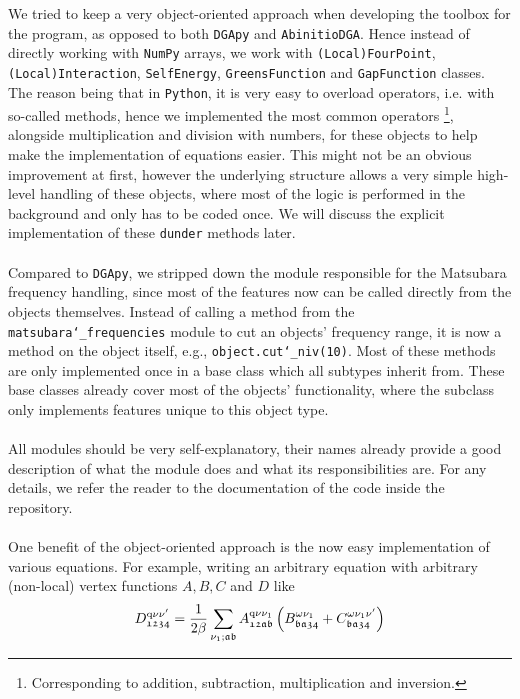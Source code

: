 \documentclass[../../main.tex]{subfiles}
\begin{document}
We tried to keep a very object-oriented approach when developing the toolbox for the program, as opposed to both \texttt{DGApy} and \texttt{AbinitioDGA}. Hence instead of directly working with \texttt{NumPy} arrays, we work with \texttt{(Local)FourPoint}, \texttt{(Local)Interaction}, \texttt{SelfEnergy}, \texttt{GreensFunction} and \texttt{GapFunction} classes. The reason being that in \texttt{Python}, it is very easy to overload operators, i.e. with so-called  methods, hence we implemented the most common operators \footnote{Corresponding to addition, subtraction, multiplication and inversion.}, alongside multiplication and division with numbers, for these objects to help make the implementation of equations easier. This might not be an obvious improvement at first, however the underlying structure allows a very simple high-level handling of these objects, where most of the logic is performed in the background and only has to be coded once. We will discuss the explicit implementation of these \texttt{dunder} methods later.
\\\\
Compared to \texttt{DGApy}, we stripped down the module responsible for the Matsubara frequency handling, since most of the features now can be called directly from the objects themselves. Instead of calling a method from the \texttt{matsubara\char`_frequencies} module to cut an objects' frequency range, it is now a method on the object itself, e.g., \texttt{object.cut\char`_niv(10)}. Most of these methods are only implemented once in a base class which all subtypes inherit from. These base classes already cover most of the objects' functionality, where the subclass only implements features unique to this object type.
\\\\
All modules should be very self-explanatory, their names already provide a good description of what the module does and what its responsibilities are. For any details, we refer the reader to the documentation of the code inside the repository.
\\\\
One benefit of the object-oriented approach is the now easy implementation of various equations. For example, writing an arbitrary equation with arbitrary (non-local) vertex functions $A,B,C$ and $D$ like
\begin{align}
	D^{\text{q}\nu\nu'}_{\mathfrak{1234}}=\frac{1}{2\beta} \sum_{\nu_1;\mathfrak{ab}} A^{\text{q}\nu\nu_1}_{\mathfrak{12ab}}\left (B^{\omega\nu_1}_{\mathfrak{ba34}}+C^{\omega\nu_1\nu'}_{\mathfrak{ba34}}\right )
\end{align}
\end{document}
